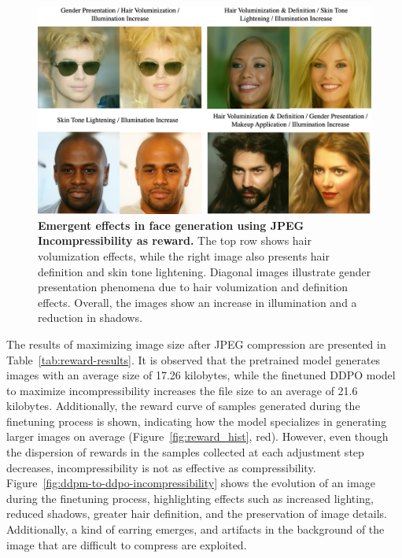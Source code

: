 \begin{figure}[ht]
  \centering
  \includegraphics[scale=0.85]{img/results/incompressibility-effects.png}
  \vspace{-0pt}  %
    \captionsetup{width=\textwidth} %
    \caption{\textbf{Emergent effects in face generation using JPEG Incompressibility as reward.} The top row shows hair volumization effects, while the right image also presents hair definition and skin tone lightening. Diagonal images illustrate gender presentation phenomena due to hair volumization and definition effects. Overall, the images show an increase in illumination and a reduction in shadows.}
    \label{fig:incompressibility-effects}
\end{figure}

\noindent The results of maximizing image size after JPEG compression are presented in Table~\ref{tab:reward-results}. It is observed that the pretrained model generates images with an average size of 17.26 kilobytes, while the finetuned DDPO model to maximize incompressibility increases the file size to an average of 21.6 kilobytes. Additionally, the reward curve of samples generated during the finetuning process is shown, indicating how the model specializes in generating larger images on average (Figure~\ref{fig:reward_hist}, red). However, even though the dispersion of rewards in the samples collected at each adjustment step decreases, incompressibility is not as effective as compressibility. Figure~\ref{fig:ddpm-to-ddpo-incompressibility}  shows the evolution of an image during the finetuning process, highlighting effects such as increased lighting, reduced shadows, greater hair definition, and the preservation of image details. Additionally, a kind of earring emerges, and artifacts in the background of the image that are difficult to compress are exploited. \\

